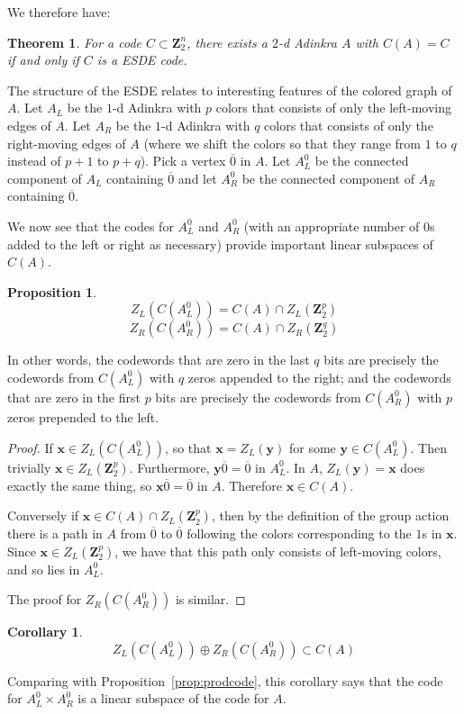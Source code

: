 \documentclass[12pt,twoside,singlespace]{article}
\numberwithin{equation}{section}
\newtheorem{thm}[equation]{Theorem}
\newtheorem{cor}[equation]{Corollary}
\newtheorem{prop}[equation]{Proposition}
\theoremstyle{definition}
\newcommand{\ZZ}{\mathbf{Z}}
\renewcommand{\vec}[1]{\mathbf{#1}}
\begin{document}
We therefore have:
\begin{thm}
\label{thm:esde}
For a code $C \subset \ZZ_2^n$, there exists a $2$-d Adinkra $A$ with $C(A) = C$ if and only if $C$ is a ESDE code.
\end{thm}




The structure of the ESDE relates to interesting features of the colored graph of $A$.  Let $A_L$ be the $1$-d Adinkra with $p$ colors that consists of only the left-moving edges of $A$.  Let $A_R$ be the $1$-d Adinkra with $q$ colors that consists of only the right-moving edges of $A$ (where we shift the colors so that they range from $1$ to $q$ instead of $p+1$ to $p+q$).  Pick a vertex $\overline{0}$ in $A$.  Let $A_L^0$ be the connected component of $A_L$ containing $\overline{0}$ and let $A_R^0$ be the connected component of $A_R$ containing $\overline{0}$.

We now see that the codes for $A_L^0$ and $A_R^0$ (with an appropriate number of $0$s added to the left or right as necessary) provide important linear subspaces of $C(A)$.

\begin{prop}
\[Z_L(C(A_L^0))=C(A)\cap Z_L(\ZZ_2^p)\]
\[Z_R(C(A_R^0))=C(A)\cap Z_R(\ZZ_2^q)\]
\end{prop}
In other words, the codewords that are zero in the last $q$ bits are precisely the codewords from $C(A_L^0)$ with $q$ zeros appended to the right; and the codewords that are zero in the first $p$ bits are precisely the codewords from $C(A_R^0)$ with $p$ zeros prepended to the left.
\begin{proof}
If $\vec{x}\in Z_L(C(A_L^0))$, so that $\vec{x}=Z_L(\vec{y})$ for some $\vec{y}\in C(A_L^0)$.  Then trivially $\vec{x}\in Z_L(\ZZ_2^p)$.  Furthermore, $\vec{y}\overline{0}=\overline{0}$ in $A_L^0$.  In $A$, $Z_L(\vec{y})=\vec{x}$ does exactly the same thing, so $\vec{x}\overline{0}=\overline{0}$ in $A$.  Therefore $\vec{x}\in C(A)$.

Conversely if $\vec{x}\in C(A)\cap Z_L(\ZZ_2^p)$, then by the definition of the group action there is a path in $A$ from $\overline{0}$ to $\overline{0}$ following the colors corresponding to the $1$s in $\vec{x}$.  Since $\vec{x}\in Z_L(\ZZ_2^p)$, we have that this path only consists of left-moving colors, and so lies in $A_L^0$.

The proof for $Z_R(C(A_R^0))$ is similar.
\end{proof}

\begin{cor}
\label{cor:cplus}
\[Z_L(C(A_L^0))\oplus Z_R(C(A_R^0))\subset C(A)\]
\end{cor}
Comparing with Proposition~\ref{prop:prodcode}, this corollary says that the code for $A_L^0\times A_R^0$ is a linear subspace of the code for $A$.
\end{document}
